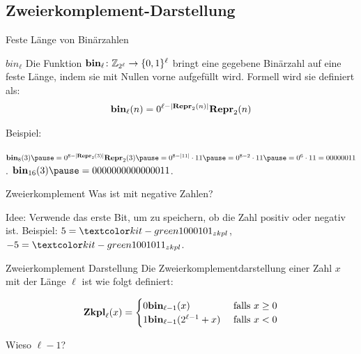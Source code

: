 \documentclass{beamer}
\begin{document}
\subsection{Zweierkomplement-Darstellung}

\begin{frame}{Feste Länge von Binärzahlen}
	\pause
	
	\begin{block}{$bin_\ell$}
		Die Funktion $\textbf{bin}_{\ell}\colon \mathbb{Z}_{2^{\ell}} \to \{0,1\}^{\ell}$ \p  bringt eine gegebene Binärzahl auf eine feste Länge\p , indem sie mit Nullen vorne aufgefüllt wird. \p Formell wird sie definiert als:\p
		\begin{align*}\textbf{bin}_{\ell}(n) = 0^{\ell- |\textbf{Repr}_2(n)|} \textbf{Repr}_2(n)\end{align*}
	\end{block}

	\pause Beispiel:
	\begin{itemize}
		\pitem $\fbin_8(3) \p = 0^{8 - |\fRepr_2(3)|}\fRepr_2(3) \p = 0^{8 - |11|}\cdot 11 \p = 0^{8 - 2} \cdot 11 \p = 0^6 \cdot 11 = 00000011$.
		\pitem $\fbin_{16}(3) \p = 0000000000000011$.
	\end{itemize}
\end{frame}

\newcommand{\definitionOfZkpl}{
\begin{align*}
\fZkpl_{\ell}(x) =
\begin{cases}
0 \fbin_{\ell-1}(x) & \text{ falls } x\geq 0 \\
1 \fbin_{\ell-1}(2^{\ell-1} + x) & \text{ falls } x< 0 
\end{cases}
\end{align*}
}

\begin{frame}{Zweierkomplement}
	\p Was ist mit negative Zahlen?
	
	\begin{itemize}
		\pitem Idee: Verwende das erste Bit, um zu speichern, ob die Zahl positiv oder negativ ist.
		\pitem Beispiel: \p $5 = \markGreen{0}101_{zkpl}$\p , $-5 = \markGreen{1}011_{zkpl}$.
	\end{itemize}

	\pause

	\begin{block}{Zweierkomplement Darstellung}
	Die Zweierkomplementdarstellung einer Zahl $x$ \p mit der Länge $\ell$ ist wie folgt definiert:\p
	\definitionOfZkpl		
	\end{block}

	\begin{itemize}
		\pitem Wieso $\ell - 1$?
	\end{itemize}
	
\end{frame}
\end{document}
